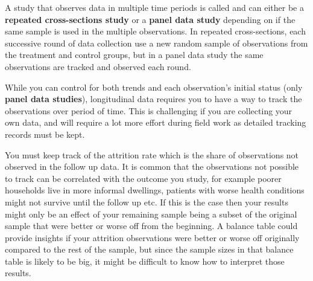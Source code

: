 A study that observes data in multiple time periods is called  and
 can either be a \textbf{repeated cross-sections study} or a \textbf{panel data study} 
depending on if the same sample is used in the multiple observations.
In repeated cross-sections, each successive round of data collection use a new random sample
of observations from the treatment and control groups, 
but in a panel data study the same observations are tracked and observed each round.

While you can control for both trends 
and each observation's initial status (only \textbf{panel data studies}), 
longitudinal data requires you to have a way to track the observations over period of time.
This is challenging if you are collecting your own data, 
and will require a lot more effort during field work as detailed tracking records must be kept.

You must keep track of the attrition rate which is the share of observations not observed in the follow up data.
It is common that the observations not possible to track can be correlated with the outcome you study,
for example poorer households live in more informal dwellings,
patients with worse health conditions might not survive until the follow up etc. 
If this is the case then your results might only be an effect of your remaining sample
being a subset of the original sample that were better or worse off from the beginning.
A balance table could provide insights if your attrition observations were better or worse off 
originally compared to the rest of the sample, 
but since the sample sizes in that balance table is likely to be big, 
it might be difficult to know how to interpret those results.

